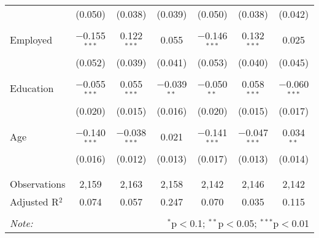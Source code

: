 \begin{table}[!htbp]
\begin{tabular}{@{\extracolsep{5pt}}lcccccc}
  & (0.050) & (0.038) & (0.039) & (0.050) & (0.038) & (0.042) \\ 
  & & & & & & \\ 
 Employed & $-$0.155$^{***}$ & 0.122$^{***}$ & 0.055 & $-$0.146$^{***}$ & 0.132$^{***}$ & 0.025 \\ 
  & (0.052) & (0.039) & (0.041) & (0.053) & (0.040) & (0.045) \\ 
  & & & & & & \\ 
 Education & $-$0.055$^{***}$ & 0.055$^{***}$ & $-$0.039$^{**}$ & $-$0.050$^{**}$ & 0.058$^{***}$ & $-$0.060$^{***}$ \\ 
  & (0.020) & (0.015) & (0.016) & (0.020) & (0.015) & (0.017) \\ 
  & & & & & & \\ 
 Age & $-$0.140$^{***}$ & $-$0.038$^{***}$ & 0.021 & $-$0.141$^{***}$ & $-$0.047$^{***}$ & 0.034$^{**}$ \\ 
  & (0.016) & (0.012) & (0.013) & (0.017) & (0.013) & (0.014) \\ 
  & & & & & & \\ 
\hline \\[-1.8ex] 
Observations & 2,159 & 2,163 & 2,158 & 2,142 & 2,146 & 2,142 \\ 
Adjusted R$^{2}$ & 0.074 & 0.057 & 0.247 & 0.070 & 0.035 & 0.115 \\ 
\hline 
\hline \\[-1.8ex] 
\textit{Note:}  & \multicolumn{6}{r}{$^{*}$p$<$0.1; $^{**}$p$<$0.05; $^{***}$p$<$0.01} \\ 
\end{tabular} 
\end{table} 
